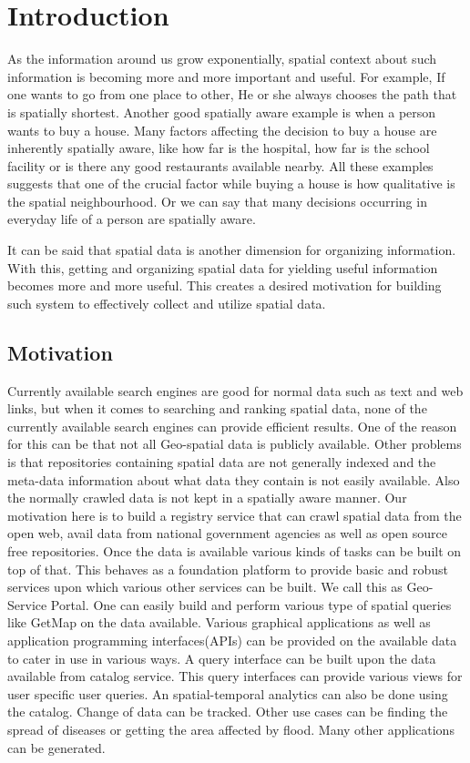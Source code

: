\chapter{Introduction}

As the information around us grow exponentially, spatial context about such information is becoming more and more important and useful. For example, If one wants to go from one place to other, He or she always chooses the path that is spatially shortest. Another good spatially aware example is when a person wants to buy a house. Many factors affecting the decision to buy a house are inherently spatially aware, like how far is the hospital, how far is the school facility or is there any good restaurants available nearby. All these examples suggests that one of the crucial factor while buying a house is how qualitative is the spatial neighbourhood. Or we can say that many decisions occurring in everyday life of a person are spatially aware.
\newline
\par
It can be said that spatial data is another dimension for organizing information. With this, getting and organizing spatial data for yielding useful information becomes more and more useful. This creates a desired motivation for building such system to effectively collect and utilize spatial data.


\section{Motivation}
Currently available search engines are good for normal data such as text and web links, but when it comes to searching and ranking spatial data, none of the currently available search engines can provide efficient results. One of the reason for this can be that not all Geo-spatial data is publicly available. Other problems is that repositories containing spatial data are not generally indexed and the meta-data information about what data they contain is not easily available. Also the normally crawled data is not kept in a spatially aware manner. Our motivation here is to build a registry service that can crawl spatial data from the open web, avail data from national government agencies as well as open source free repositories. Once the data is available various kinds of tasks can be built on top of that. This behaves as a foundation platform to provide basic and robust services upon which various other services can be built. We call this as Geo-Service Portal. One can easily build and perform various type of spatial queries like GetMap on the data available. Various graphical applications as well as application programming interfaces(APIs) can be provided on the available data to cater in use in various ways. A query interface can be built upon the data available from catalog service. This query interfaces can provide various views for user specific user queries. An spatial-temporal analytics can also be done using the catalog. Change of data can be tracked. Other use cases can be finding the spread of diseases or getting the area affected by flood. Many other applications can be generated.

